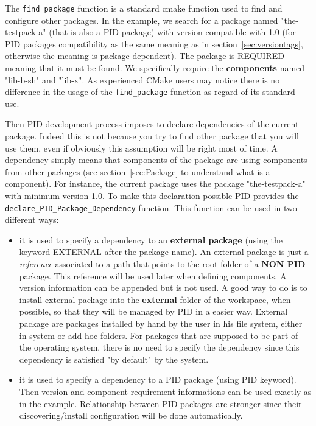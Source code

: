 \documentclass[12pt,a4paper]{article}
\begin{document}
The \texttt{find\_package} function is a standard cmake function used to find and configure other packages. In the example, we search for a package named "the-testpack-a" (that is also a PID package) with version compatible with 1.0 (for PID packages compatibility as the same meaning as in section~\ref{sec:versiontags}, otherwise the meaning is package dependent). The package is REQUIRED meaning that it must be found.  We specifically require the \textbf{components} named "lib-b-sh" and "lib-x". As experienced CMake users may notice there is no difference in the usage of the \texttt{find\_package} function as regard of its standard use. 

Then PID development process imposes to declare dependencies of the current package. Indeed this is not because you try to find other package that you will use them, even if obviously this assumption will be right most of time. A dependency simply means that components of the package are using components from other packages (see section~\ref{sec:Package} to understand what is a component). For instance, the current package uses the package "the-testpack-a" with minimum version 1.0. To make this declaration possible PID provides the \texttt{declare\_PID\_Package\_Dependency} function. This function can be used in two different ways:
\begin{itemize}
\item it is used to specify a dependency to an \textbf{external package} (using the keyword EXTERNAL after the package name). An external package is just a \textit{reference} associated to a path that points to the root folder of a \textbf{NON PID} package. This reference will be used later when defining components. A version information can be appended but is not used. A good way to do is to install external package into the \textbf{external} folder of the workspace, when possible, so that they will be managed by PID in a easier way. External package are packages installed by hand by the user in his file system, either in system or add-hoc folders. For packages that are supposed to be part of the operating system, there is no need to specify the dependency since this dependency is satisfied "by default" by the system.
\item it is used to specify a dependency to a PID package (using PID keyword). Then version and component requirement informations can be used exactly as in the example. Relationship between PID packages are stronger since their discovering/install configuration will be done automatically.
\end{itemize}
\end{document}
